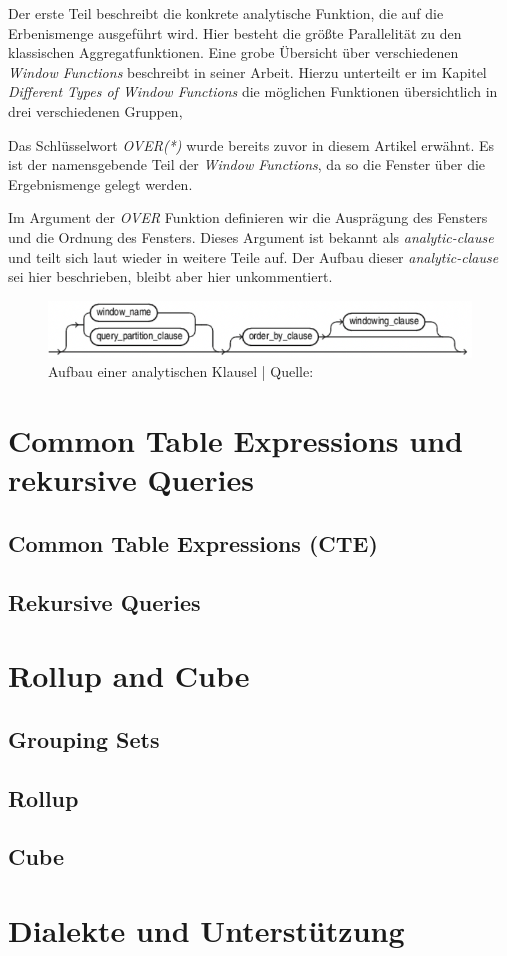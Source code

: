Der erste Teil beschreibt die konkrete analytische Funktion, die auf die
Erbenismenge ausgeführt wird. Hier besteht die größte Parallelität zu den klassischen
Aggregatfunktionen. Eine grobe Übersicht über verschiedenen \textit{Window
Functions} beschreibt \cite{ibrahaim23} in seiner Arbeit. Hierzu unterteilt er
im Kapitel \textit{Different Types of Window Functions} die möglichen Funktionen
übersichtlich in drei verschiedenen Gruppen,

Das Schlüsselwort \textit{OVER(*)} wurde bereits zuvor in diesem Artikel erwähnt.
Es ist der namensgebende Teil der \textit{Window Functions}, da so die Fenster über
die Ergebnismenge gelegt werden.

Im Argument der \textit{OVER} Funktion definieren wir die Ausprägung des
Fensters und die Ordnung des Fensters. Dieses Argument ist bekannt als \textit{analytic-clause}
und teilt sich laut \cite{oracle} wieder in weitere Teile auf. Der Aufbau dieser
\textit{analytic-clause} sei hier beschrieben, bleibt aber hier unkommentiert.

\begin{figure}[h]
	\centering
	\includegraphics[scale=0.5]{img/aufbauAnalyticClausel.jpg}
	\caption{ Aufbau einer analytischen Klausel | Quelle: \cite{oracle}}
\end{figure}


\section{Common Table Expressions und rekursive Queries}

\subsection{Common Table Expressions (CTE)}

\subsection{Rekursive Queries}

\section{Rollup and Cube}

\subsection{Grouping Sets}

\subsection{Rollup}

\subsection{Cube}

\section{Dialekte und Unterstützung}
